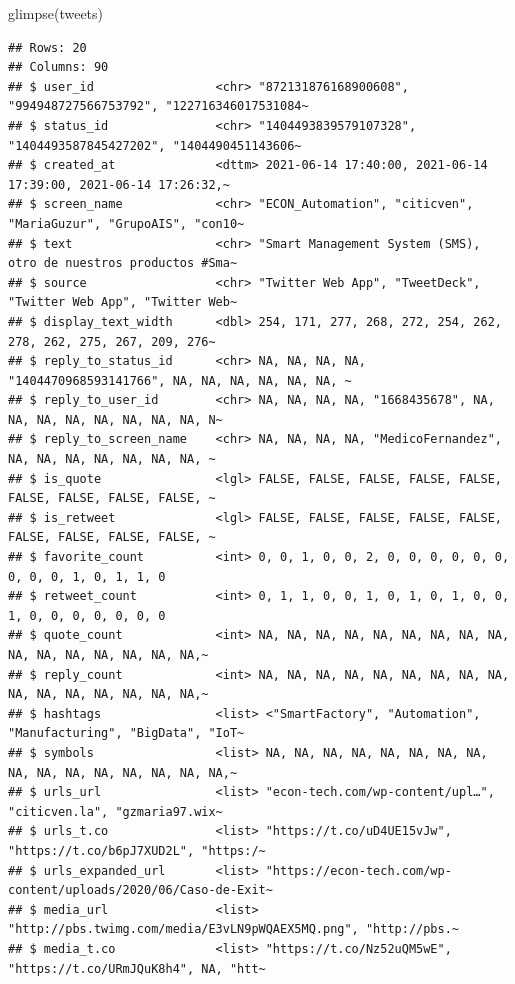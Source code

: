 \documentclass[
]{book}
\newenvironment{Shaded}{\begin{snugshade}}{\end{snugshade}}
\newcommand{\FunctionTok}[1]{\textcolor[rgb]{0.00,0.00,0.00}{#1}}
\newcommand{\NormalTok}[1]{#1}
\begin{document}
\begin{Shaded}
\begin{Highlighting}[]
\FunctionTok{glimpse}\NormalTok{(tweets)}
\end{Highlighting}
\end{Shaded}

\begin{verbatim}
## Rows: 20
## Columns: 90
## $ user_id                 <chr> "872131876168900608", "994948727566753792", "122716346017531084~
## $ status_id               <chr> "1404493839579107328", "1404493587845427202", "1404490451143606~
## $ created_at              <dttm> 2021-06-14 17:40:00, 2021-06-14 17:39:00, 2021-06-14 17:26:32,~
## $ screen_name             <chr> "ECON_Automation", "citicven", "MariaGuzur", "GrupoAIS", "con10~
## $ text                    <chr> "Smart Management System (SMS), otro de nuestros productos #Sma~
## $ source                  <chr> "Twitter Web App", "TweetDeck", "Twitter Web App", "Twitter Web~
## $ display_text_width      <dbl> 254, 171, 277, 268, 272, 254, 262, 278, 262, 275, 267, 209, 276~
## $ reply_to_status_id      <chr> NA, NA, NA, NA, "1404470968593141766", NA, NA, NA, NA, NA, NA, ~
## $ reply_to_user_id        <chr> NA, NA, NA, NA, "1668435678", NA, NA, NA, NA, NA, NA, NA, NA, N~
## $ reply_to_screen_name    <chr> NA, NA, NA, NA, "MedicoFernandez", NA, NA, NA, NA, NA, NA, NA, ~
## $ is_quote                <lgl> FALSE, FALSE, FALSE, FALSE, FALSE, FALSE, FALSE, FALSE, FALSE, ~
## $ is_retweet              <lgl> FALSE, FALSE, FALSE, FALSE, FALSE, FALSE, FALSE, FALSE, FALSE, ~
## $ favorite_count          <int> 0, 0, 1, 0, 0, 2, 0, 0, 0, 0, 0, 0, 0, 0, 0, 1, 0, 1, 1, 0
## $ retweet_count           <int> 0, 1, 1, 0, 0, 1, 0, 1, 0, 1, 0, 0, 1, 0, 0, 0, 0, 0, 0, 0
## $ quote_count             <int> NA, NA, NA, NA, NA, NA, NA, NA, NA, NA, NA, NA, NA, NA, NA, NA,~
## $ reply_count             <int> NA, NA, NA, NA, NA, NA, NA, NA, NA, NA, NA, NA, NA, NA, NA, NA,~
## $ hashtags                <list> <"SmartFactory", "Automation", "Manufacturing", "BigData", "IoT~
## $ symbols                 <list> NA, NA, NA, NA, NA, NA, NA, NA, NA, NA, NA, NA, NA, NA, NA, NA,~
## $ urls_url                <list> "econ-tech.com/wp-content/upl…", "citicven.la", "gzmaria97.wix~
## $ urls_t.co               <list> "https://t.co/uD4UE15vJw", "https://t.co/b6pJ7XUD2L", "https:/~
## $ urls_expanded_url       <list> "https://econ-tech.com/wp-content/uploads/2020/06/Caso-de-Exit~
## $ media_url               <list> "http://pbs.twimg.com/media/E3vLN9pWQAEX5MQ.png", "http://pbs.~
## $ media_t.co              <list> "https://t.co/Nz52uQM5wE", "https://t.co/URmJQuK8h4", NA, "htt~

\end{verbatim}
\end{document}
